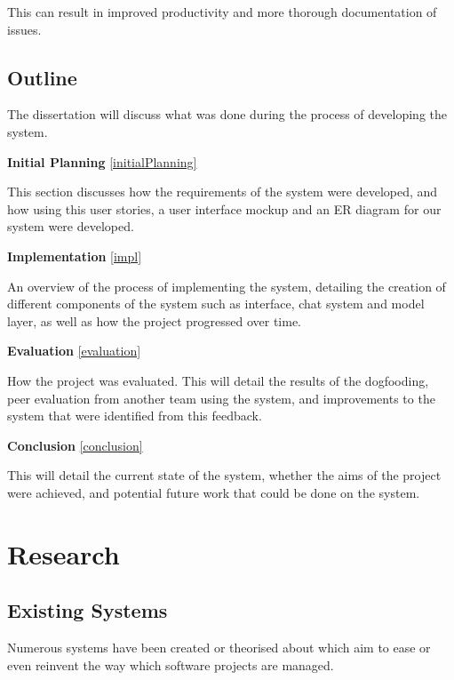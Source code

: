 \documentclass[a4paper]{l3proj}
\begin{document}
This can result in improved productivity and more thorough documentation of issues.






\section{Outline}
\label{outline}

The dissertation will discuss what was done during the process of developing the system.

\textbf{Initial Planning} \autoref{initialPlanning}

This section discusses how the requirements of the system were developed, and how using this user stories, a user interface mockup and an ER diagram for our system were developed.

\textbf{Implementation} \autoref{impl}

An overview of the process of implementing the system, detailing the creation of different components of the system such as interface, chat system and model layer, as well as how the project progressed over time.

\textbf{Evaluation} \autoref{evaluation}

How the project was evaluated.  This will detail the results of the dogfooding, peer evaluation from another team using the system, and improvements to the system that were identified from this feedback.

\textbf{Conclusion} \autoref{conclusion}

This will detail the current state of the system, whether the aims of the project were achieved, and potential future work that could be done on the system.


\chapter{Research}
\label{research}
\section{Existing Systems}
\label{existingSystems}

Numerous systems have been created or theorised about which aim to ease or even reinvent the way which software projects are managed.
\end{document}
